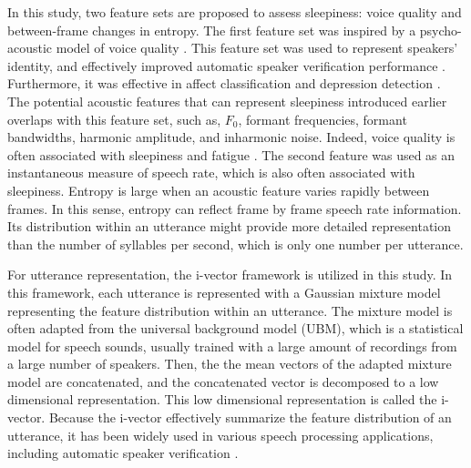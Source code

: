 In this study, two feature sets are proposed to assess sleepiness: voice quality and between-frame changes in entropy. 
The first feature set was inspired by a psycho-acoustic model of voice quality \cite{Kreiman2014, Garellek2016}. %
This feature set was used to represent speakers' identity, and effectively improved automatic speaker verification performance \cite{kreiman2015relationship, Park2016, Park2017, Park2018JASA}.
Furthermore, it was effective in affect classification \cite{Park2018IS} and depression detection \cite{afshan2018effectiveness}.
The potential acoustic features that can represent sleepiness introduced earlier overlaps with this feature set,
such as, $F_0$, formant frequencies, formant bandwidths, harmonic amplitude, and inharmonic noise.
Indeed, voice quality is often associated with sleepiness and fatigue \cite[Chap. 9]{Kreiman2011}. 
The second feature was used as an instantaneous measure of speech rate, which is also often associated with sleepiness.
Entropy is large when an acoustic feature varies rapidly between frames. In this sense, entropy can reflect frame by frame speech rate information. Its distribution within an utterance might provide more detailed representation than the number of syllables per second, which is only one number per utterance. %


For utterance representation, the i-vector framework \cite{dehak2011front} is utilized in this study. 
In this framework, each utterance is represented with a Gaussian mixture model representing the feature distribution within an utterance. The mixture model is often adapted from the universal background model (UBM), which is a statistical model for speech sounds, usually trained with a large amount of recordings from a large number of speakers. Then, the the mean vectors of the adapted mixture model are concatenated, and the concatenated vector is decomposed to a low dimensional representation. This low dimensional representation is called the i-vector.
Because the i-vector effectively summarize the feature distribution of an utterance, it has been widely used in various speech processing applications, including automatic speaker verification \cite{Hansen2015}.

